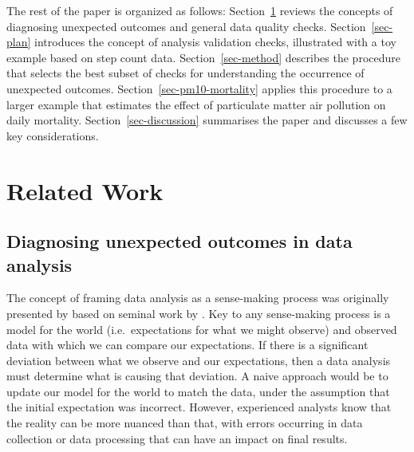 \documentclass[
  12pt,
]{interact}
\begin{document}
The rest of the paper is organized as follows:
Section~\ref{sec-lit-review} reviews the concepts of diagnosing
unexpected outcomes and general data quality checks.
Section~\ref{sec-plan} introduces the concept of analysis validation
checks, illustrated with a toy example based on step count data.
Section~\ref{sec-method} describes the procedure that selects the best
subset of checks for understanding the occurrence of unexpected
outcomes. Section~\ref{sec-pm10-mortality} applies this procedure to a
larger example that estimates the effect of particulate matter air
pollution on daily mortality. Section~\ref{sec-discussion} summarises
the paper and discusses a few key considerations.

\section{Related Work}\label{sec-lit-review}

\subsection{Diagnosing unexpected outcomes in data
analysis}\label{diagnosing-unexpected-outcomes-in-data-analysis}

The concept of framing data analysis as a sense-making process was
originally presented by \citet{grolemund_cognitive_2014} based on
seminal work by \citet{wild1999statistical}. Key to any sense-making
process is a model for the world (i.e.~expectations for what we might
observe) and observed data with which we can compare our expectations.
If there is a significant deviation between what we observe and our
expectations, then a data analysis must determine what is causing that
deviation. A naive approach would be to update our model for the world
to match the data, under the assumption that the initial expectation was
incorrect. However, experienced analysts know that the reality can be
more nuanced than that, with errors occurring in data collection or data
processing that can have an impact on final results.
\end{document}
